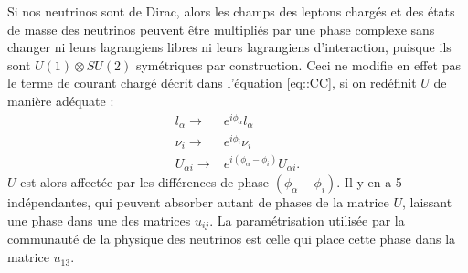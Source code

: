            Si nos neutrinos sont de Dirac, alors les champs des leptons chargés et des états de masse des neutrinos peuvent être multipliés par une phase complexe sans changer ni leurs lagrangiens libres ni leurs lagrangiens d'interaction, puisque ils sont $U(1)\otimes SU(2)$ symétriques par construction. Ceci ne modifie en effet pas le terme de courant chargé décrit dans l'équation \eqref{eq::CC}, si on redéfinit $U$ de manière adéquate :
            \begin{eqnarray}
                l_{\alpha}\to & e^{i\phi_{\alpha}}l_{\alpha} \\
                \nu_{i}\to & e^{i\phi_i}\nu_{i} \\
                U_{\alpha i}\to & e^{i(\phi_{\alpha}-\phi_i)}U_{\alpha i}.
            \end{eqnarray}
            $U$ est alors affectée par les différences de phase $(\phi_{\alpha}-\phi_i)$. Il y en a 5 indépendantes, qui peuvent absorber autant de phases de la matrice $U$, laissant une phase dans une des matrices $u_{ij}$. La paramétrisation utilisée par la communauté de la physique des neutrinos est celle qui place cette phase dans la matrice $u_{13}$.
            
